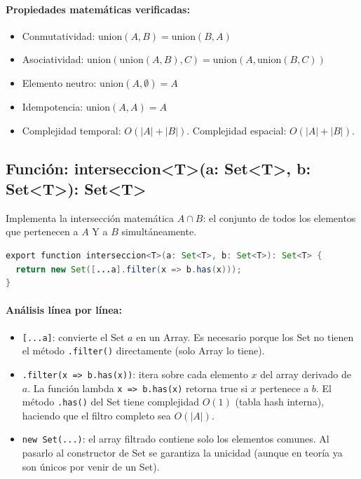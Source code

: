 \documentclass[11pt,a4paper]{article}
\begin{document}
\paragraph{Propiedades matemáticas verificadas:}
\begin{itemize}[noitemsep]
    \item Conmutatividad: $\text{union}(A,B) = \text{union}(B,A)$
    \item Asociatividad: $\text{union}(\text{union}(A,B),C) = \text{union}(A,\text{union}(B,C))$
    \item Elemento neutro: $\text{union}(A,\emptyset) = A$
    \item Idempotencia: $\text{union}(A,A) = A$
    \item Complejidad temporal: $O(|A|+|B|)$. Complejidad espacial: $O(|A|+|B|)$.
\end{itemize}

\subsection{Función: interseccion\textless{}T\textgreater{}(a: Set\textless{}T\textgreater{}, b: Set\textless{}T\textgreater{}): Set\textless{}T\textgreater{}}
Implementa la intersección matemática $A \cap B$: el conjunto de todos los elementos que pertenecen a $A$ Y a $B$ simultáneamente.

\begin{lstlisting}[language=Java, caption={operations.ts - función interseccion}]
export function interseccion<T>(a: Set<T>, b: Set<T>): Set<T> {
  return new Set([...a].filter(x => b.has(x)));
}
\end{lstlisting}

\paragraph{Análisis línea por línea:}
\begin{itemize}[noitemsep]
    \item \texttt{[...a]}: convierte el Set $a$ en un Array. Es necesario porque los Set no tienen el método \texttt{.filter()} directamente (solo Array lo tiene).
    \item \texttt{.filter(x => b.has(x))}: itera sobre cada elemento $x$ del array derivado de $a$. La función lambda \texttt{x => b.has(x)} retorna true si $x$ pertenece a $b$. El método \texttt{.has()} del Set tiene complejidad $O(1)$ (tabla hash interna), haciendo que el filtro completo sea $O(|A|)$.
    \item \texttt{new Set(...)}: el array filtrado contiene solo los elementos comunes. Al pasarlo al constructor de Set se garantiza la unicidad (aunque en teoría ya son únicos por venir de un Set).
\end{itemize}
\end{document}

